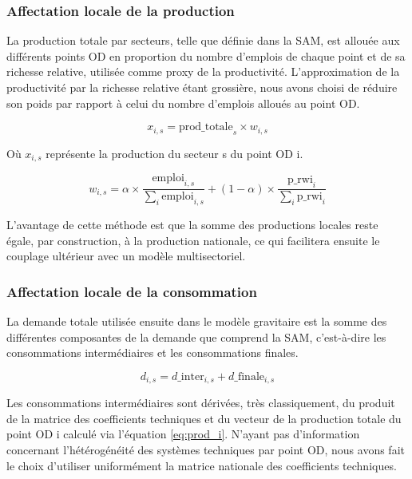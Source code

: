 \documentclass[12pt,a4paper,french]{report}
\begin{document}
	\subsubsection{Affectation locale de la production}
	\label{subsubsec:affectation_prod}
	La production totale par secteurs, telle que définie dans la SAM, est allouée aux différents points OD en proportion du nombre d'emplois de chaque point et de sa richesse relative, utilisée comme proxy de la productivité. L'approximation de la productivité par la richesse relative étant grossière, nous avons choisi de réduire son poids par rapport à celui du nombre d'emplois alloués au point OD.
	
	\begin{equation}
		x_{i,s} = \text{prod\_totale}_s \times w_{i,s}
		\label{eq:prod_i}
	\end{equation}
	
	Où $x_{i,s}$ représente la production du secteur s du point OD i.
	

	\begin{equation}
			w_{i,s} = \alpha \times \frac{\text{emploi}_{i,s}}{\sum_i \text{emploi}_{i,s}} + (1 - \alpha) \times \frac{\text{p\_rwi}_{i}}{\sum_i \text{p\_rwi}_{i}}
	\end{equation}
	
	L'avantage de cette méthode est que la somme des productions locales reste égale, par construction, à la production nationale, ce qui facilitera ensuite le couplage ultérieur avec un modèle multisectoriel.
	
	\subsubsection{Affectation locale de la consommation}
	\label{subsubsec:affectation_conso}
	
	La demande totale utilisée ensuite dans le modèle gravitaire est la somme des différentes composantes de la demande que comprend la SAM, c'est-à-dire les consommations intermédiaires et les consommations finales.
	
	\begin{equation}
		d_{i,s} = d\_\text{inter}_{i,s} + d\_\text{finale}_{i,s} 
		\label{eq:conso}
	\end{equation}
	\medskip
	
	Les consommations intermédiaires sont dérivées, très classiquement, du produit de la matrice des coefficients techniques et du vecteur de la production totale du point OD i calculé via l'équation \ref{eq:prod_i}. N'ayant pas d'information concernant l'hétérogénéité des systèmes techniques par point OD, nous avons fait le choix d'utiliser uniformément la matrice nationale des coefficients techniques. 
	
\end{document}

